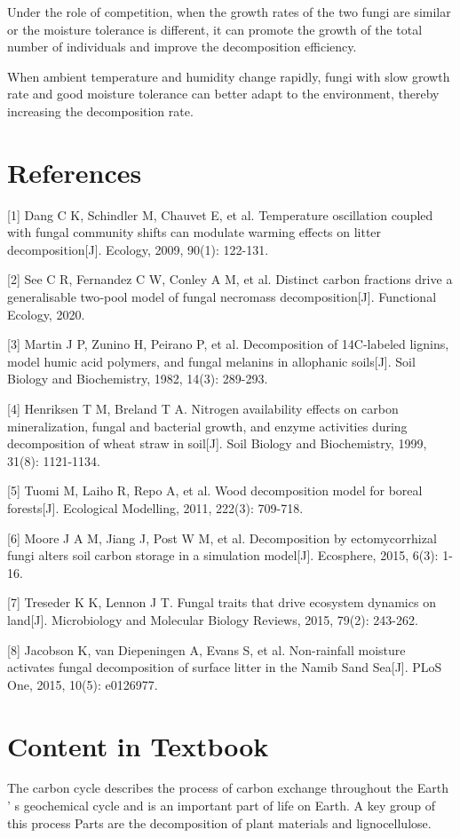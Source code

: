 \documentclass{mcmthesis}
\begin{document}
Under the role of competition, when the growth rates of the two fungi are similar or the moisture tolerance is different, it can promote the growth of the total number of individuals and improve the decomposition efficiency. 

When ambient temperature and humidity change rapidly, fungi with slow growth rate and good moisture tolerance can better adapt to the environment, thereby increasing the decomposition rate.
\section{References}
[1] Dang C K, Schindler M, Chauvet E, et al. Temperature oscillation coupled with fungal community shifts can modulate warming effects on litter decomposition[J]. Ecology, 2009, 90(1): 122-131.

[2] See C R, Fernandez C W, Conley A M, et al. Distinct carbon fractions drive a generalisable two‐pool model of fungal necromass decomposition[J]. Functional Ecology, 2020.

[3] Martin J P, Zunino H, Peirano P, et al. Decomposition of 14C-labeled lignins, model humic acid polymers, and fungal melanins in allophanic soils[J]. Soil Biology and Biochemistry, 1982, 14(3): 289-293.

[4] Henriksen T M, Breland T A. Nitrogen availability effects on carbon mineralization, fungal and bacterial growth, and enzyme activities during decomposition of wheat straw in soil[J]. Soil Biology and Biochemistry, 1999, 31(8): 1121-1134.

[5] Tuomi M, Laiho R, Repo A, et al. Wood decomposition model for boreal forests[J]. Ecological Modelling, 2011, 222(3): 709-718.

[6] Moore J A M, Jiang J, Post W M, et al. Decomposition by ectomycorrhizal fungi alters soil carbon storage in a simulation model[J]. Ecosphere, 2015, 6(3): 1-16.

[7] Treseder K K, Lennon J T. Fungal traits that drive ecosystem dynamics on land[J]. Microbiology and Molecular Biology Reviews, 2015, 79(2): 243-262.

[8] Jacobson K, van Diepeningen A, Evans S, et al. Non-rainfall moisture activates fungal decomposition of surface litter in the Namib Sand Sea[J]. PLoS One, 2015, 10(5): e0126977.

\newpage
\section{Content in Textbook}
The carbon cycle describes the process of carbon exchange throughout the Earth ' s geochemical cycle and is an important part of life on Earth. A key group of this process Parts are the decomposition of plant materials and lignocellulose. 
\end{document}

